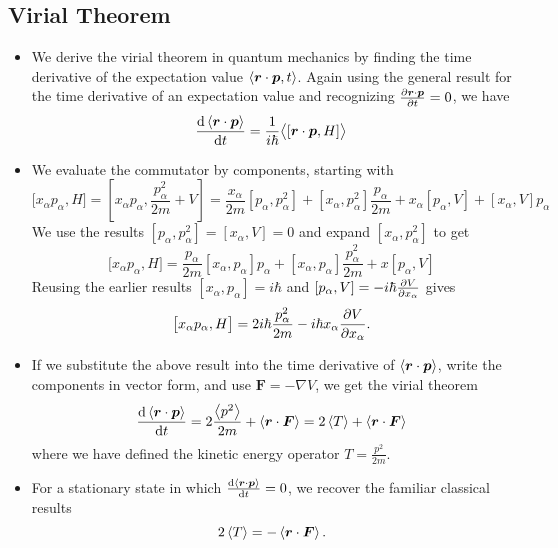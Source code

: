 \documentclass[11pt, a4paper]{article}
\renewcommand{\grad}{\nabla}
\renewcommand{\vec}[1]{\bm{#1}}  %
\renewcommand{\r}{\vec{r}}  %
\newcommand{\evb}[1]{\big \langle {#1} \big \rangle}  %
\begin{document}
\subsection{Virial Theorem}
\begin{itemize}
	\item We derive the virial theorem in quantum mechanics by finding the time derivative of the expectation value $ \ev{\r \cdot \vec{p}, t} $. Again using the general result for the time derivative of an expectation value and recognizing $ \pdv{\r \cdot \vec{p}}{t} = 0 $, we have
	\begin{equation*}
		\dv{\ev{\r \cdot \vec{p}}}{t} = \frac{1}{i \hbar} \evb{[\r \cdot \vec{p}, H]}
	\end{equation*}
 	
 	\item We evaluate the commutator by components, starting with
 	\begin{equation*}
 		\big[ x_{\alpha} p_{\alpha}, H\big] = \left[x_{\alpha}p_{\alpha}, \frac{p_{\alpha}^{2}}{2m} + V\right] = \frac{x_{\alpha}}{2m} [p_{\alpha}, p_{\alpha}^{2}] + [x_{\alpha}, p_{\alpha}^{2}]\frac{p_{\alpha}}{2m} + x_{\alpha}[p_{\alpha}, V] + [x_{\alpha}, V]p_{\alpha}
 	\end{equation*}
 	We use the results $ [p_{\alpha}, p_{\alpha}^{2}] = [x_{\alpha}, V] = 0 $ and expand $ [x_{\alpha}, p_{\alpha}^{2}] $ to get
 	\begin{equation*}
 		\big[ x_{\alpha} p_{\alpha}, H\big] = \frac{p_{\alpha}}{2m}[x_{\alpha}, p_{\alpha}]p_{\alpha} + [x_{\alpha}, p_{\alpha}]\frac{p_{\alpha}^{2}}{2m} + x[p_{\alpha}, V]
 	\end{equation*}
 	Reusing the earlier results $ [x_{\alpha}, p_{\alpha}] = i \hbar $ and $ [p_{\alpha}, V] = - i \hbar \pdv{V}{x_{\alpha}} $ gives
 	\begin{equation*}
 		\big[ x_{\alpha} p_{\alpha}, H\big] = 2i \hbar \frac{p_{\alpha}^{2}}{2m} - i \hbar x_{\alpha} \pdv{V}{x_{\alpha}}.
 	\end{equation*}
 	
 	\item If we substitute the above result into the time derivative of $ \ev{\r \cdot \vec{p}} $, write the components in vector form, and use $ \vec{F} = - \grad V $, we get the virial theorem
 	\begin{equation*}
 		\dv{\ev{\r \cdot \vec{p}}}{t} = 2\frac{\ev{p^{2}}}{2m} + \ev{\r \cdot \vec{F}} = 2 \ev{T} + \ev{\r \cdot \vec{F}}
 	\end{equation*}
 	where we have defined the kinetic energy operator $ T = \frac{p^{2}}{2m} $.
 	
 	\item For a stationary state in which $ \dv{\ev{\r \cdot \vec{p}}}{t} = 0 $, we recover the familiar classical results
 	\begin{equation*}
 		2\ev{T} = - \ev{\r \cdot \vec{F}}.
 	\end{equation*}
\end{itemize}
\end{document}

